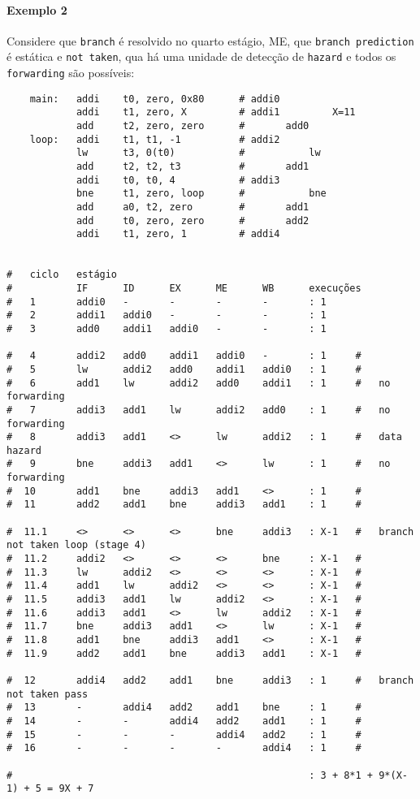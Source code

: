 \documentclass{article}
\begin{document}
\paragraph{Exemplo 2}Considere que \texttt{branch} é resolvido no quarto estágio, ME, que \texttt{branch prediction} é estática e \texttt{not taken}, qua há uma unidade de detecção de \texttt{hazard} e todos os \texttt{forwarding} são possíveis:
\begin{scriptsize}
    \myStyleRISCV
    \begin{lstlisting}
    main:   addi    t0, zero, 0x80      # addi0
            addi    t1, zero, X         # addi1         X=11
            add     t2, zero, zero      #       add0
    loop:   addi    t1, t1, -1          # addi2
            lw      t3, 0(t0)           #           lw
            add     t2, t2, t3          #       add1
            addi    t0, t0, 4           # addi3
            bne     t1, zero, loop      #           bne
            add     a0, t2, zero        #       add1
            add     t0, zero, zero      #       add2
            addi    t1, zero, 1         # addi4


#   ciclo   estágio
#           IF      ID      EX      ME      WB      execuções
#   1       addi0   -       -       -       -       : 1
#   2       addi1   addi0   -       -       -       : 1
#   3       add0    addi1   addi0   -       -       : 1

#   4       addi2   add0    addi1   addi0   -       : 1     #
#   5       lw      addi2   add0    addi1   addi0   : 1     #
#   6       add1    lw      addi2   add0    addi1   : 1     #   no forwarding
#   7       addi3   add1    lw      addi2   add0    : 1     #   no forwarding
#   8       addi3   add1    <>      lw      addi2   : 1     #   data hazard
#   9       bne     addi3   add1    <>      lw      : 1     #   no forwarding
#  10       add1    bne     addi3   add1    <>      : 1     #
#  11       add2    add1    bne     addi3   add1    : 1     #

#  11.1     <>      <>      <>      bne     addi3   : X-1   #   branch not taken loop (stage 4)
#  11.2     addi2   <>      <>      <>      bne     : X-1   #
#  11.3     lw      addi2   <>      <>      <>      : X-1   #
#  11.4     add1    lw      addi2   <>      <>      : X-1   #
#  11.5     addi3   add1    lw      addi2   <>      : X-1   #
#  11.6     addi3   add1    <>      lw      addi2   : X-1   #
#  11.7     bne     addi3   add1    <>      lw      : X-1   #
#  11.8     add1    bne     addi3   add1    <>      : X-1   #
#  11.9     add2    add1    bne     addi3   add1    : X-1   #

#  12       addi4   add2    add1    bne     addi3   : 1     #   branch not taken pass
#  13       -       addi4   add2    add1    bne     : 1     #
#  14       -       -       addi4   add2    add1    : 1     #
#  15       -       -       -       addi4   add2    : 1     #
#  16       -       -       -       -       addi4   : 1     #

#                                                   : 3 + 8*1 + 9*(X-1) + 5 = 9X + 7
    \end{lstlisting}
\end{scriptsize}
\end{document}

